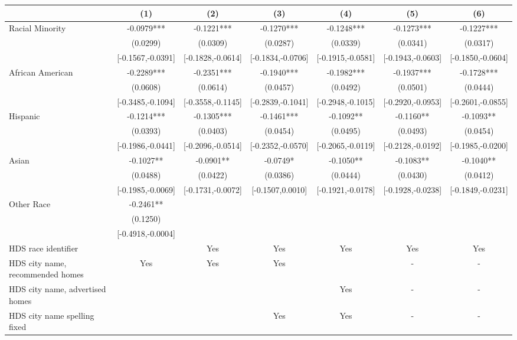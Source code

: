 \begin{table}[htbp]
{\begin{tabular}{l*{6}{c}}
                    \cmidrule(lr){2-2}\cmidrule(lr){3-3}\cmidrule(lr){4-4}\cmidrule(lr){5-5}\cmidrule(lr){6-6}\cmidrule(lr){7-7}
                    &\multicolumn{1}{c}{(1)}   &\multicolumn{1}{c}{(2)}   &\multicolumn{1}{c}{(3)}   &\multicolumn{1}{c}{(4)}   &\multicolumn{1}{c}{(5)}   &\multicolumn{1}{c}{(6)}\\
\midrule
Racial Minority & -0.0979*** & -0.1221*** & -0.1270*** & -0.1248*** & -0.1273*** & -0.1227*** \\
 & (0.0299) & (0.0309) & (0.0287) & (0.0339) & (0.0341) & (0.0317) \\
 & [-0.1567,-0.0391] & [-0.1828,-0.0614] & [-0.1834,-0.0706] & [-0.1915,-0.0581] & [-0.1943,-0.0603] & [-0.1850,-0.0604] \\
\midrule
African American & -0.2289*** & -0.2351*** & -0.1940*** & -0.1982*** & -0.1937*** & -0.1728*** \\
 & (0.0608) & (0.0614) & (0.0457) & (0.0492) & (0.0501) & (0.0444) \\
 & [-0.3485,-0.1094] & [-0.3558,-0.1145] & [-0.2839,-0.1041] & [-0.2948,-0.1015] & [-0.2920,-0.0953] & [-0.2601,-0.0855] \\
Hispanic & -0.1214*** & -0.1305*** & -0.1461*** & -0.1092** & -0.1160** & -0.1093** \\
 & (0.0393) & (0.0403) & (0.0454) & (0.0495) & (0.0493) & (0.0454) \\
 & [-0.1986,-0.0441] & [-0.2096,-0.0514] & [-0.2352,-0.0570] & [-0.2065,-0.0119] & [-0.2128,-0.0192] & [-0.1985,-0.0200] \\
Asian & -0.1027** & -0.0901** & -0.0749* & -0.1050** & -0.1083** & -0.1040** \\
 & (0.0488) & (0.0422) & (0.0386) & (0.0444) & (0.0430) & (0.0412) \\
 & [-0.1985,-0.0069] & [-0.1731,-0.0072] & [-0.1507,0.0010] & [-0.1921,-0.0178] & [-0.1928,-0.0238] & [-0.1849,-0.0231] \\
Other Race & -0.2461** &  &  &  &  &  \\
 & (0.1250) &  &  &  &  &  \\
 & [-0.4918,-0.0004] &  &  &  &  &  \\
\midrule
HDS race identifier & & Yes & Yes & Yes & Yes & Yes \\
HDS city name, recommended homes & Yes & Yes & Yes & & - & -\\
HDS city name, advertised homes &  &  &  & Yes & - & -\\
HDS city name spelling fixed & & & Yes & Yes & - & -\\

\end{tabular}}
\end{table}
